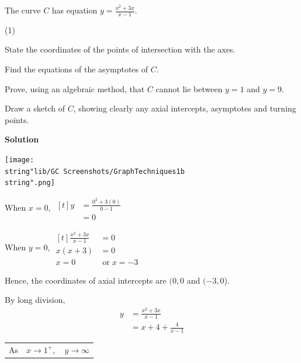 \documentclass[11pt,a4paper]{book}
\begin{document}
\begin{example}{}

The curve $C$ has equation ${\displaystyle y=\frac{x^{2}+3x}{x-1}}$.

\begin{tasks}[label=(\alph*),label-width=3.5ex](1)

\task State the coordinates of the points of intersection with the axes.

\task Find the equations of the asymptotes of $C$.

\task Prove, using an algebraic method, that $C$ cannot lie between
$y=1$ and $y=9$.

\task Draw a sketch of $C$, showing clearly any axial intercepts,
asymptotes and turning points.

\end{tasks}

\textbf{Solution}

\begin{center}
\texttt{[image: \\string"lib/GC Screenshots/GraphTechniques1b\\string".png]}
\par\end{center}

\begin{tasks}[label=(\alph*),label-width=3.5ex]

\task  When $x=0$,
$
\begin{aligned}[t]
y & =\frac{0^{2}+3\left(0\right)}{0-1}\\
 & =0
\end{aligned}
$

When $y=0$,
$
\begin{aligned}[t]
\frac{x^{2}+3x}{x-1} & =0\\
x\left(x+3\right) & =0\\
x=0 & \;\text{or}\;x=-3
\end{aligned}
$

Hence, the coordinates of axial intercepts are $(0,0$ and $(-3,0$).

\task  By long division,
\begin{align*}
{\displaystyle y} & =\frac{x^{2}+3x}{x-1}\\
 & =x+4+\frac{4}{x-1}
\end{align*}

\begin{tabular}{>{\raggedright}p{0.6cm}>{\raggedright}p{1.8cm}>{\raggedright}p{2cm}}
As & $x\rightarrow1^{+},$ & $y\rightarrow\infty$


\end{tabular}
\end{tasks}
\end{example}
\end{document}
